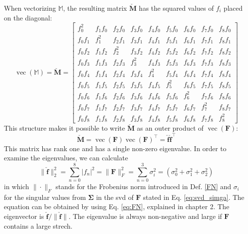 When vectorizing $\mathbb{M}$, the resulting matrix $\mathbf{\check{M}}$ has the squared values of $f_i$ placed on the diagonal:
\[
\operatorname{vec}(\mathbb{M})= \mathbf{\check{M}} = \begin{bmatrix} f_0^2 & f_1f_0 & f_2f_0 & f_3f_0 & f_4f_0 & f_5f_0 & f_6f_0 & f_7f_0 & f_8f_0 \\ f_0f_1 & f_1^2 & f_2f_1 & f_3f_1 & f_4f_1 & f_5f_1 & f_6f_1 & f_7f_1 & f_8f_1 \\ f_0f_2 & f_1f_2 & f_2^2 & f_3f_2 & f_4f_2 & f_5f_2 & f_6f_2 & f_7f_2 & f_8f_2 \\ f_0f_3 & f_1f_3 & f_2f_3 & f_3^2 & f_4f_3 & f_5f_3 & f_6f_3 & f_7f_3 & f_8f_3 \\ f_0f_4 & f_1f_4 & f_2f_4 & f_3f_4 & f_4^2 & f_5f_4 & f_6f_4 & f_7f_4 & f_8f_4 \\ f_0f_5 & f_1f_5 & f_2f_5 & f_3f_5 & f_4f_5 & f_5^2 & f_6f_5 & f_7f_5 & f_8f_5 \\ f_0f_6 & f_1f_6 & f_2f_6 & f_3f_6 & f_4f_6 & f_5f_6 & f_6^2 & f_7f_6 & f_8f_6 \\ f_0f_7 & f_1f_7 & f_2f_7 & f_3f_7 & f_4f_7 & f_5f_7 & f_6f_7 & f_7^2 & f_8f_7 \\ f_0f_8 & f_1f_8 & f_2f_8 & f_3f_8 & f_4f_8 & f_5f_8 & f_6f_8 & f_7f_8 & f_8^2 \end{bmatrix}
\]
This structure makes it possible to write $\mathbf{\check{M}}$ as an outer product of $\operatorname{vec}(\mathbf{F})$:
\[
\mathbf{\check{M}}= \operatorname{vec}(\mathbf{F})\operatorname{vec}(\mathbf{F})^\intercal = \mathbf{\check{f}} \mathbf{\check{f}}^\intercal
\]
This matrix has rank one and has a single non-zero eigenvalue. In order to examine the eigenvalues, we can calculate
\[
\| \mathbf{\check{f}} \|^{2}_{2} = \sum_{n=0}^8 | f_n |^2 = \| \mathbf{F} \|^{2}_{F} = \sum_{n=0}^3 \sigma^2_i = \left( \sigma_0^2 + \sigma_1^2 + \sigma_2^2 \right)
\]
in which $\|\cdot\|_F$ stands for the Frobenius norm introduced in Def. \ref{FN} and $\sigma_i$ for the singular values from $\mathbf{\Sigma}$ in the \acrshort{svd} of $\mathbf{F}$ stated in Eq. \ref{eq:svd_simga}. The equation can be obtained by using Eq. \ref{eq:FN}, explained in chapter 2. The eigenvector is $\mathbf{\check{f}} / \| \mathbf{\check{f}} \|$. The eigenvalue is always non-negative and large if $\mathbf{F}$ contains a large strech.

